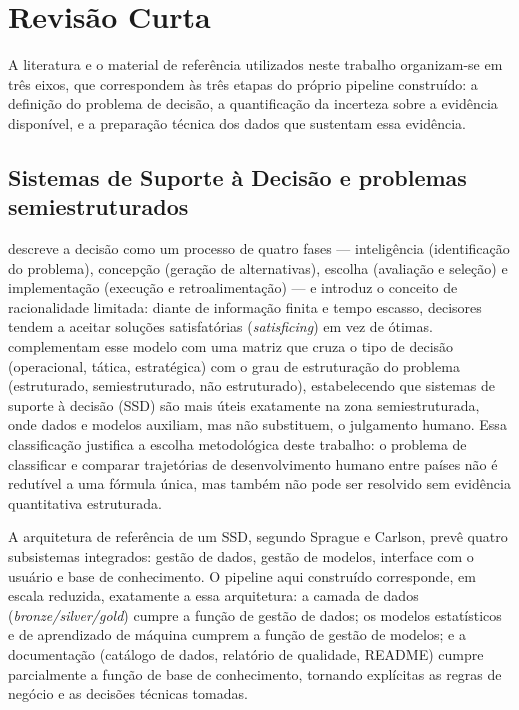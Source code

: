 \documentclass[11pt,a4paper]{article}
\begin{document}
\section{Revisão Curta}

A literatura e o material de referência utilizados neste trabalho organizam-se em três eixos, que correspondem às três etapas do próprio pipeline construído: a definição do problema de decisão, a quantificação da incerteza sobre a evidência disponível, e a preparação técnica dos dados que sustentam essa evidência.

\subsection{Sistemas de Suporte à Decisão e problemas semiestruturados}

\citet{simon1960} descreve a decisão como um processo de quatro fases --- inteligência (identificação do problema), concepção (geração de alternativas), escolha (avaliação e seleção) e implementação (execução e retroalimentação) --- e introduz o conceito de racionalidade limitada: diante de informação finita e tempo escasso, decisores tendem a aceitar soluções satisfatórias (\textit{satisficing}) em vez de ótimas. \citet{gorry1971} complementam esse modelo com uma matriz que cruza o tipo de decisão (operacional, tática, estratégica) com o grau de estruturação do problema (estruturado, semiestruturado, não estruturado), estabelecendo que sistemas de suporte à decisão (SSD) são mais úteis exatamente na zona semiestruturada, onde dados e modelos auxiliam, mas não substituem, o julgamento humano. Essa classificação justifica a escolha metodológica deste trabalho: o problema de classificar e comparar trajetórias de desenvolvimento humano entre países não é redutível a uma fórmula única, mas também não pode ser resolvido sem evidência quantitativa estruturada.

A arquitetura de referência de um SSD, segundo Sprague e Carlson, prevê quatro subsistemas integrados: gestão de dados, gestão de modelos, interface com o usuário e base de conhecimento. O pipeline aqui construído corresponde, em escala reduzida, exatamente a essa arquitetura: a camada de dados (\textit{bronze/silver/gold}) cumpre a função de gestão de dados; os modelos estatísticos e de aprendizado de máquina cumprem a função de gestão de modelos; e a documentação (catálogo de dados, relatório de qualidade, README) cumpre parcialmente a função de base de conhecimento, tornando explícitas as regras de negócio e as decisões técnicas tomadas.
\end{document}
